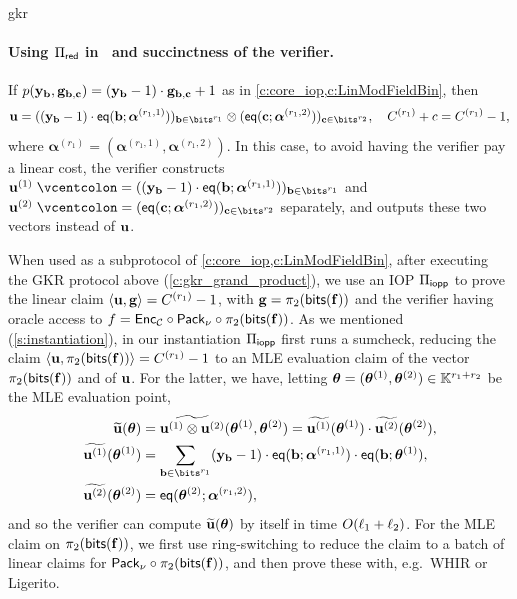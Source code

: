 \begin{lncsappendix}{gkr}
\paragraph{Using $\Pi_{\mathsf{red}}$ in \ftwoz \ and succinctness of the verifier. }

If $p(\mathbf{y}_{\mathbf{b}}, \mathbf{g}_{\mathbf{b},\mathbf{c}}) = (\mathbf{y}_{\mathbf{b}}-1)\cdot \mathbf{g}_{\mathbf{b},\mathbf{c}} +1$ as in \cref{c:core_iop,c:LinModFieldBin}, then $$\uu=((\yy_\bb - 1)\cdot \eq(\bb;\bm\alpha^{(r_1,1)}))_{\bb\in \bits^{r_1}} \otimes (\eq(\cc;\bm\alpha^{(r_1,2)}))_{\cc\in \bits^{r_2}}, \quad C^{(r_1)} + c =  C^{(r_1)} -1,$$  where $\bm{\alpha}^{(r_1)} = (\bm{\alpha}^{(r_1,1)}, \bm{\alpha}^{(r_1,2)})$.
    In this case, to avoid having the verifier pay a linear cost, the verifier constructs $\uu^{(1)}\defeq ((\yy_\bb - 1)\cdot\eq(\bb;\bm\alpha^{(r_1,1)}))_{\bb\in \bits^{r_1}} $ and $\uu^{(2)}\defeq (\eq(\cc;\bm\alpha^{(r_1,2)}))_{\cc\in \bits^{r_2}}$ separately, and outputs these two vectors instead of $\mathbf{u}$.
    
     When used as a subprotocol of \cref{c:core_iop,c:LinModFieldBin}, after executing the GKR protocol above (\cref{c:gkr_grand_product}), we use an IOP $\Pi_{\mathsf{iopp}}$ to prove the linear claim $\langle \mathbf{u}, \mathbf{g}\rangle= C^{(r_1)}-1$, with $\mathbf{g}=\pi_2(\mathsf{bits}(\mathbf{f}))$ and  the verifier having oracle access to $f=\mathsf{Enc}_{\mathcal{C}} \circ \mathsf{Pack}_\nu \circ \pi_2(\mathsf{bits}(\mathbf{f}))$. As we mentioned (\cref{s:instantiation}), in our instantiation $\Pi_{\mathsf{iopp}}$ first runs a   sumcheck, reducing the claim $\langle \mathbf{u}, \pi_2(\mathsf{bits}(\mathbf{f}))\rangle= C^{(r_1)}-1$  to an MLE evaluation claim  of the vector $\pi_2(\mathsf{bits}(\mathbf{f}))$ and of $\mathbf{u}$. For the latter, we have, letting $\bm{\theta}=(\bm{\theta}^{(1)}, \bm{\theta}^{(2)})\in \mathbb{K}^{r_1+r_2}$ be the MLE evaluation point,   \begin{align*}\mle{\uu}(\bm{\theta})&=\mle{\uu^{(1)} \otimes \uu^{(2)}}(\bm{\theta}^{(1)}, \bm{\theta}^{(2)}) = \mle{\uu^{(1)}}(\bm{\theta}^{(1)}) \cdot \mle{\uu^{(2)}}(\bm{\theta}^{(2)}),\\  
     \mle{\uu^{(1)}}(\bm{\theta}^{(1)})&=     \sum_{\bb\in\bits^{r_1}} (\yy_\bb-1)\cdot\eq(\bb;\bm\alpha^{(r_1,1)})\cdot\eq(\bb;\bm{\theta}^{(1)}),\\
     \mle{\uu^{(2)}}(\bm{\theta}^{(2)})& =  \eq(\bm{\theta}^{(2)};\bm\alpha^{(r_1,2)}),
     \end{align*} and so the verifier can compute ${\widetilde{\mathbf{u}}}(\bm{\theta})$ by itself in time $O(\ell_1 +\ell_2)$. For the MLE claim on $\pi_2(\mathsf{bits}(\mathbf{f}))$, we first use ring-switching \cite{binius2} to reduce the claim to a batch of linear claims for $\mathsf{Pack}_\nu\circ \pi_2(\mathsf{bits}(\mathbf{f}))$, and then prove these with, e.g.\  WHIR or Ligerito.   



\end{lncsappendix}
